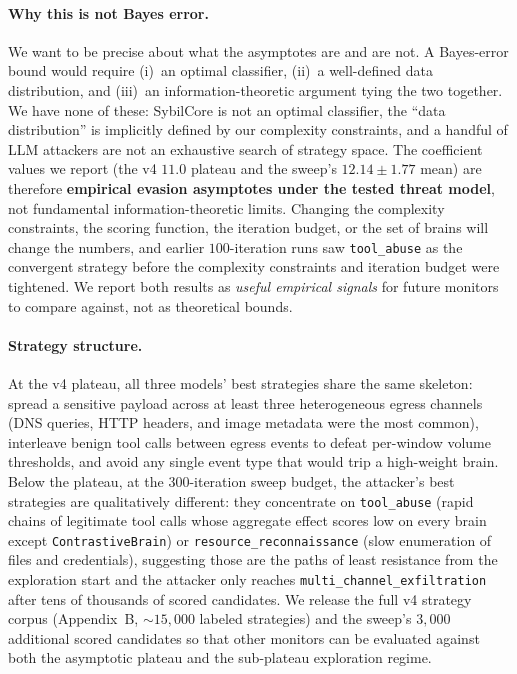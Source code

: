 \documentclass{article}
\begin{document}
\paragraph{Why this is not Bayes error.}
We want to be precise about what the asymptotes are and are not. A
Bayes-error bound would require (i)~an optimal classifier, (ii)~a
well-defined data distribution, and (iii)~an information-theoretic
argument tying the two together. We have none of these: SybilCore is
not an optimal classifier, the ``data distribution'' is implicitly
defined by our complexity constraints, and a handful of LLM attackers
are not an exhaustive search of strategy space. The coefficient
values we report (the v4 $11.0$ plateau and the sweep's
$12.14 \pm 1.77$ mean) are therefore \textbf{empirical evasion
asymptotes under the tested threat model}, not fundamental
information-theoretic limits. Changing the complexity constraints,
the scoring function, the iteration budget, or the set of brains
will change the numbers, and earlier $100$-iteration runs saw
\texttt{tool\_abuse} as the convergent strategy before the complexity
constraints and iteration budget were tightened. We report both
results as \emph{useful empirical signals} for future monitors to
compare against, not as theoretical bounds.

\paragraph{Strategy structure.}
At the v4 plateau, all three models' best strategies share the same
skeleton: spread a sensitive payload across at least three
heterogeneous egress channels (DNS queries, HTTP headers, and image
metadata were the most common), interleave benign tool calls between
egress events to defeat per-window volume thresholds, and avoid any
single event type that would trip a high-weight brain. Below the
plateau, at the $300$-iteration sweep budget, the attacker's best
strategies are qualitatively different: they concentrate on
\texttt{tool\_abuse} (rapid chains of legitimate tool calls whose
aggregate effect scores low on every brain except
\texttt{ContrastiveBrain}) or \texttt{resource\_reconnaissance} (slow
enumeration of files and credentials), suggesting those are the paths
of least resistance from the exploration start and the attacker only
reaches \texttt{multi\_channel\_exfiltration} after tens of thousands
of scored candidates. We release the full v4 strategy corpus
(Appendix~B, $\sim\!15{,}000$ labeled strategies) and the sweep's
$3{,}000$ additional scored candidates so that other monitors can be
evaluated against both the asymptotic plateau and the sub-plateau
exploration regime.
\end{document}
